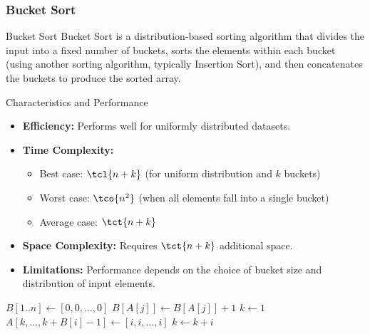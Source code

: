 \newpage
\subsubsection{Bucket Sort}
\begin{definition}[]{Bucket Sort}
    Bucket Sort is a distribution-based sorting algorithm that divides the input into a fixed number of buckets, sorts the elements within each bucket (using another sorting algorithm, typically Insertion Sort), and then concatenates the buckets to produce the sorted array.
\end{definition}

\begin{properties}[]{Characteristics and Performance}
    \begin{itemize}
        \item \textbf{Efficiency:} Performs well for uniformly distributed datasets.
        \item \textbf{Time Complexity:}
              \begin{itemize}
                  \item Best case: $\tcl{n + k}$ (for uniform distribution and $k$ buckets)
                  \item Worst case: $\tco{n^2}$ (when all elements fall into a single bucket)
                  \item Average case: $\tct{n + k}$
              \end{itemize}
        \item \textbf{Space Complexity:} Requires $\tct{n + k}$ additional space.
        \item \textbf{Limitations:} Performance depends on the choice of bucket size and distribution of input elements.
    \end{itemize}
\end{properties}

\begin{algorithm}
    \begin{spacing}{1.2}
        \caption{Bucket Sort}
        \begin{algorithmic}[1]
                \State $B[1..n] \gets [0, 0, \ldots, 0]$
                    \State $B[A[j]] \gets B[A[j]] + 1$ 
                \EndFor
                \State $k \gets 1$
                    \State $A[k, \ldots, k + B[i] - 1] \gets [i, i, \ldots, i]$ 
                    \State $k \gets k + i$ 
                \EndFor
            \EndProcedure
        \end{algorithmic}
    \end{spacing}
\end{algorithm}


